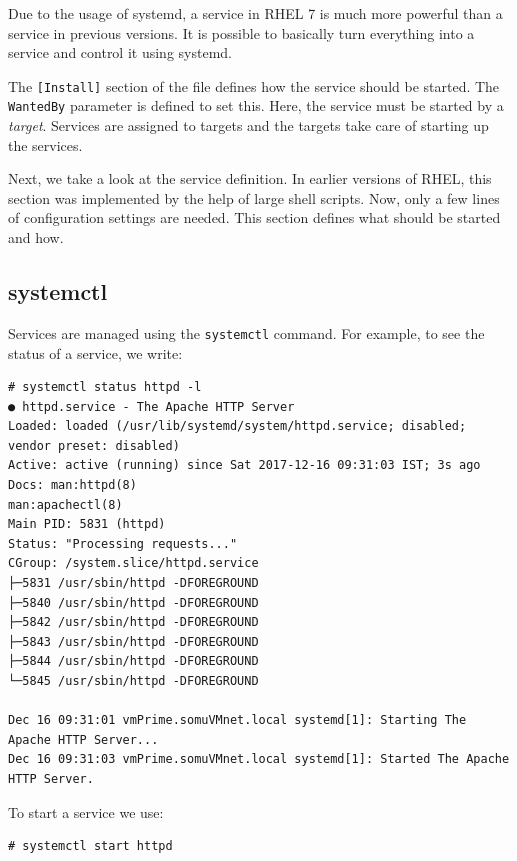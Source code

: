\noindent
Due to the usage of systemd, a service in RHEL 7 is much more powerful than a service in previous versions. It is possible to basically turn everything into a service and control it using systemd. 

The \verb|[Install]| section of the file defines how the service should be started. The \verb|WantedBy| parameter is defined to set this. Here, the service must be started by a \textit{target}. Services are assigned to targets and the targets take care of starting up the services. 

Next, we take a look at the service definition. In earlier versions of RHEL, this section was implemented by the help of large shell scripts. Now, only a few lines of configuration settings are needed. This section defines what should be started and how. 

\subsection{systemctl}
Services are managed using the \verb|systemctl| command. For example, to see the status of a service, we write:

\vspace{-15pt}
\begin{verbatim}
# systemctl status httpd -l
● httpd.service - The Apache HTTP Server
Loaded: loaded (/usr/lib/systemd/system/httpd.service; disabled; vendor preset: disabled)
Active: active (running) since Sat 2017-12-16 09:31:03 IST; 3s ago
Docs: man:httpd(8)
man:apachectl(8)
Main PID: 5831 (httpd)
Status: "Processing requests..."
CGroup: /system.slice/httpd.service
├─5831 /usr/sbin/httpd -DFOREGROUND
├─5840 /usr/sbin/httpd -DFOREGROUND
├─5842 /usr/sbin/httpd -DFOREGROUND
├─5843 /usr/sbin/httpd -DFOREGROUND
├─5844 /usr/sbin/httpd -DFOREGROUND
└─5845 /usr/sbin/httpd -DFOREGROUND

Dec 16 09:31:01 vmPrime.somuVMnet.local systemd[1]: Starting The Apache HTTP Server...
Dec 16 09:31:03 vmPrime.somuVMnet.local systemd[1]: Started The Apache HTTP Server.
\end{verbatim}
\vspace{-10pt}

To start a service we use:

\vspace{-15pt}
\begin{verbatim}
# systemctl start httpd
\end{verbatim}
\vspace{-10pt}

